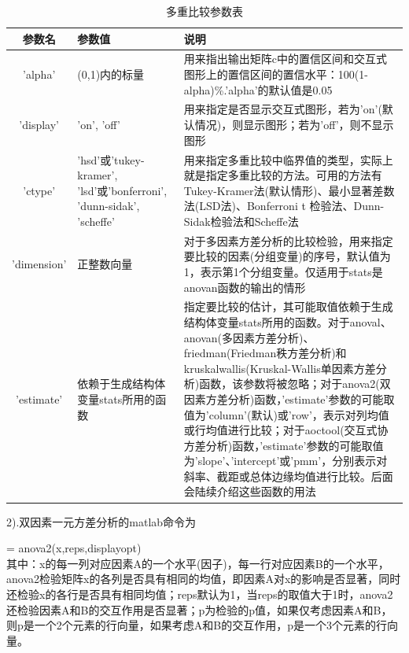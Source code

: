         \begin{table}[H]
        \caption{多重比较参数表}
        \label{tab:多重比较参数表}
        \begin{tabularx}{\textwidth}{|c|X|X|}%
        \toprule
         参数名& 参数值& 说明\\\midrule
        'alpha' & (0,1)内的标量 & 用来指出输出矩阵c中的置信区间和交互式图形上的置信区间的置信水平：100(1-alpha)\%.'alpha'的默认值是0.05\\\hline
        'display'  & 'on', 'off' & 用来指定是否显示交互式图形，若为'on'(默认情况)，则显示图形；若为'off'，则不显示图形\\\hline
        'ctype' & 'hsd'或'tukey-kramer', 'lsd'或'bonferroni', 'dunn-sidak', 'scheffe'& 用来指定多重比较中临界值的类型，实际上就是指定多重比较的方法。可用的方法有Tukey-Kramer法(默认情形)、最小显著差数法(LSD法)、Bonferroni t 检验法、Dunn-Sidak检验法和Scheffe法\\\hline
        'dimension' &正整数向量 & 对于多因素方差分析的比较检验，用来指定要比较的因素(分组变量)的序号，默认值为1，表示第1个分组变量。仅适用于stats是anovan函数的输出的情形\\\hline
        'estimate' & 依赖于生成结构体变量stats所用的函数 & 指定要比较的估计，其可能取值依赖于生成结构体变量stats所用的函数。对于anoval、anovan(多因素方差分析)、friedman(Friedman秩方差分析)和kruskalwallis(Kruskal-Wallis单因素方差分析)函数，该参数将被忽略；对于anova2(双因素方差分析)函数，'estimate'参数的可能取值为'column'(默认)或'row'，表示对列均值或行均值进行比较；对于aoctool(交互式协方差分析)函数，'estimate'参数的可能取值为'slope'、'intercept'或'pmm'，分别表示对斜率、截距或总体边缘均值进行比较。后面会陆续介绍这些函数的用法\\
        \bottomrule
        \end{tabularx}
        \end{table}
        \par
        2).双因素一元方差分析的matlab命令为
        \par
        [p,table,stats] = anova2(x,reps,displayopt)\\
        其中：x的每一列对应因素A的一个水平(因子)，每一行对应因素B的一个水平，anova2检验矩阵x的各列是否具有相同的均值，即因素A对x的影响是否显著，同时还检验x的各行是否具有相同均值；reps默认为1，当reps的取值大于1时，anova2还检验因素A和B的交互作用是否显著；p为检验的p值，如果仅考虑因素A和B，则p是一个2个元素的行向量，如果考虑A和B的交互作用，p是一个3个元素的行向量。
